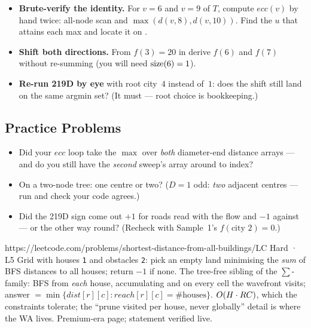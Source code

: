 \begin{hardeningbox}
\begin{itemize}[nosep, leftmargin=1.4em]
  \item \textbf{Brute-verify the identity.} For $v = 6$ and $v = 9$ of $T$, compute
        $\mathit{ecc}(v)$ by hand twice: all-node scan and $\max(d(v,8), d(v,10))$.
        Find the $u$ that attains each max and locate it on .
  \item \textbf{Shift both directions.} From $f(3) = 20$ in  derive
        $f(6)$ and $f(7)$ without re-summing (you will need $\operatorname{size}(6) = 1$).
  \item \textbf{Re-run 219D by eye} with root city~$4$ instead of~$1$: does the shift
        still land on the same argmin set? (It must --- root choice is bookkeeping.)
\end{itemize}
\end{hardeningbox}

\subsection{Practice Problems}

\begin{stuckbox}
\begin{itemize}[nosep, leftmargin=1.4em]
  \item Did your $\mathit{ecc}$ loop take the $\max$ over \emph{both} diameter-end
        distance arrays --- and do you still have the \emph{second} sweep's array
        around to index?
  \item On a two-node tree: one centre or two? ($D=1$ odd: \emph{two} adjacent
        centres --- run  and check your code agrees.)
  \item Did the 219D sign come out $+1$ for roads read with the flow and $-1$ against
        --- or the other way round? (Recheck with Sample~1's $f(\text{city }2)=0$.)
\end{itemize}
\end{stuckbox}

\begin{practiceset}
    {https://leetcode.com/problems/shortest-distance-from-all-buildings/}{LC Hard · L5}
    {Grid with houses \texttt{1} and obstacles \texttt{2}: pick an empty land
    minimising the \emph{sum} of BFS distances to all houses; return $-1$ if none.
    The tree-free sibling of the $\sum$-family: BFS from \emph{each} house,
    accumulating  and  on every cell
    the wavefront visits; answer $= \min\{\mathit{dist}[r][c] :
    \mathit{reach}[r][c] = \#\text{houses}\}$. $O(H \cdot RC)$, which the
    constraints tolerate; the ``prune visited per house, never globally'' detail is
    where the WA lives. Premium-era page; statement verified live.}
\end{practiceset}

